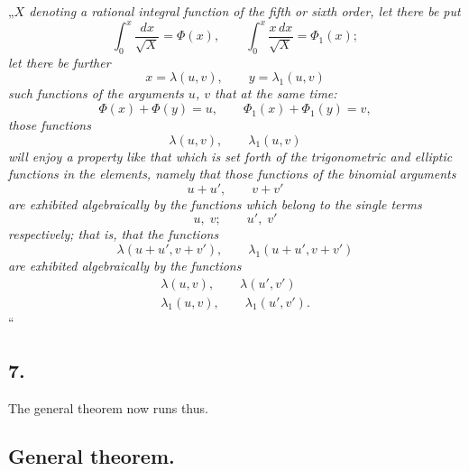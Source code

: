 \documentclass{article}
\begin{document}
„\emph{$X$ denoting a rational integral function of the fifth or sixth order, let there be put}
\[ \int_0^{x} \frac{dx}{\sqrt{X}} = \Phi(x), \qquad \int_0^{x} \frac{x\,dx}{\sqrt{X}} = \Phi_1(x); \]
\emph{let there be further}
\[ x = \lambda(u,v), \qquad y = \lambda_1(u,v) \]
\emph{such functions of the arguments $u$, $v$ that at the same time:}
\[ \Phi(x) + \Phi(y) = u, \qquad \Phi_1(x) + \Phi_1(y) = v, \]
\emph{those functions}
\[ \lambda(u,v), \qquad \lambda_1(u,v) \]
\emph{will enjoy a property like that which is set forth of the trigonometric and elliptic functions in the elements, namely that those functions of the binomial arguments}
\[ u + u', \qquad v + v' \]
\emph{are exhibited algebraically by the functions which belong to the single terms}
\[ u, \; v; \qquad u', \; v' \]
\emph{respectively; that is, that the functions}
\[ \lambda(u + u', v + v'), \qquad \lambda_1(u + u', v + v') \]
\emph{are exhibited algebraically by the functions}
\[ \begin{aligned} \lambda(u,v), \qquad \lambda(u',v') \\ \lambda_1(u,v), \qquad \lambda_1(u',v'). \end{aligned} \]“

\subsection*{7.}

The general theorem now runs thus.

\subsection*{General theorem.}
\end{document}

